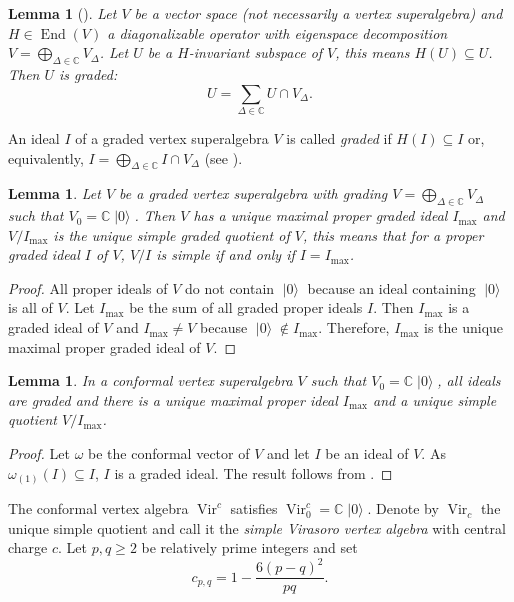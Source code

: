 \documentclass[a4paper, 12pt, reqno]{amsart}
\newtheorem{lemma}[theorem]{Lemma}
\theoremstyle{remark}
\numberwithin{equation}{subsection}
\DeclareMathOperator{\Vir}{Vir}
\DeclareMathOperator{\End}{End}
\DeclareMathOperator{\vac}{|0\rangle}
\begin{document}
\begin{lemma}[{\cite[Corollary 1.1]{kac_bombay_2013}}]
  \label{lmm:9}
  Let $V$ be a vector space (not necessarily a vertex superalgebra) and $H \in \End(V)$ a diagonalizable operator with eigenspace decomposition $V = \bigoplus_{\Delta \in \mathbb{C}}V_{\Delta}$.
  Let $U$ be a $H$-invariant subspace of $V$, this means $H(U) \subseteq U$.
  Then $U$ is graded:
  \begin{equation*}
    U = \sum_{\Delta \in \mathbb{C}}U \cap V_{\Delta}.
  \end{equation*}
\end{lemma}

An ideal $I$ of a graded vertex superalgebra $V$ is called \emph{graded} if $H(I) \subseteq I$ or, equivalently, $I = \bigoplus_{\Delta \in \mathbb{C}}I \cap V_{\Delta}$ (see ).

\begin{lemma}
  \label{lmm:10}
  Let $V$ be a graded vertex superalgebra with grading $V = \bigoplus_{\Delta \in \mathbb{C}}V_{\Delta}$ such that $V_0 = \mathbb{C}\vac$.
  Then $V$ has a unique maximal proper graded ideal $I_{\max}$ and $V/I_{\max}$ is the unique simple graded quotient of $V$, this means that for a proper graded ideal $I$ of $V$, $V/I$ is simple if and only if $I = I_{\max}$.
\end{lemma}

\begin{proof}
  All proper ideals of $V$ do not contain $\vac$ because an ideal containing $\vac$ is all of $V$.
  Let $I_{\max}$ be the sum of all graded proper ideals $I$.
  Then $I_{\max}$ is a graded ideal of $V$ and $I_{\max} \neq V$ because $\vac \notin I_{\max}$.
  Therefore, $I_{\max}$ is the unique maximal proper graded ideal of $V$.
\end{proof}

\begin{lemma}
  \label{lmm:11}
  In a conformal vertex superalgebra $V$ such that $V_0 = \mathbb{C}\vac$, all ideals are graded and there is a unique maximal proper ideal $I_{\max}$ and a unique simple quotient $V/I_{\max}$.
\end{lemma}

\begin{proof}
  Let $\omega$ be the conformal vector of $V$ and let $I$ be an ideal of $V$.
  As $\omega_{(1)}(I) \subseteq I$, $I$ is a graded ideal.
  The result follows from .
\end{proof}

The conformal vertex algebra $\Vir^c$ satisfies $\Vir^c_0 = \mathbb{C}\vac$.
Denote by $\Vir_c$ the unique simple quotient and call it the \emph{simple Virasoro vertex algebra} with central charge $c$.
Let $p, q \ge 2$ be relatively prime integers and set
\begin{equation*}
  c_{p, q} = 1 - \frac{6(p - q)^2}{pq}.
\end{equation*}
\end{document}
